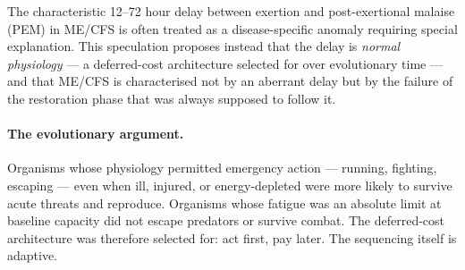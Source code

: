\begin{speculation}
\label{spec:evolutionary-deferred-cost}

The characteristic 12--72 hour delay between exertion and post-exertional malaise (PEM) in ME/CFS
is often treated as a disease-specific anomaly requiring special explanation. This speculation
proposes instead that the delay is \emph{normal physiology} --- a deferred-cost architecture
selected for over evolutionary time --- and that ME/CFS is characterised not by an aberrant
delay but by the failure of the restoration phase that was always supposed to follow it.

\paragraph{The evolutionary argument.}
Organisms whose physiology permitted emergency action --- running, fighting, escaping --- even
when ill, injured, or energy-depleted were more likely to survive acute threats and reproduce.
Organisms whose fatigue was an absolute limit at baseline capacity did not
escape predators or survive combat. The deferred-cost architecture was therefore selected for:
act first, pay later. The sequencing itself is adaptive.


\end{speculation}
